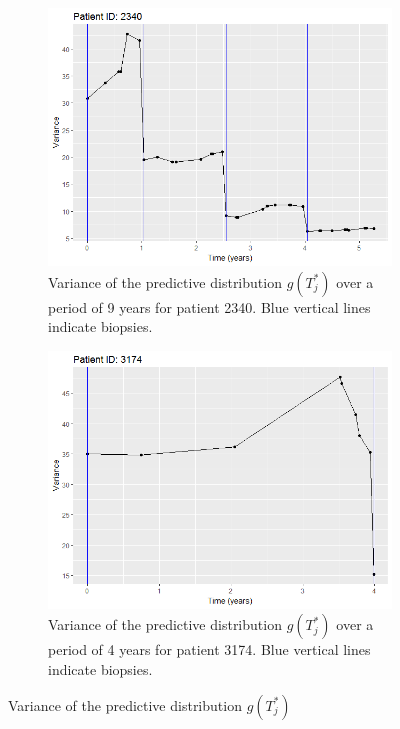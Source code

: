 \begin{figure}[!htb]
    \centering
    \captionsetup{justification=centering}
    \begin{subfigure}[b]{0.45\textwidth}
        \includegraphics[width=\textwidth]{images/variance/variance_pred_dist_2340.png}
        \caption{Variance of the predictive distribution $g(T^*_j)$ over a period of 9 years for patient 2340. Blue vertical lines indicate biopsies.}
        \label{fig : variance_pred_dist_2340}
    \end{subfigure}   
    \begin{subfigure}[b]{0.45\textwidth}
        \includegraphics[width=\textwidth]{images/variance/variance_pred_dist_3174.png}
        \caption{Variance of the predictive distribution $g(T^*_j)$ over a period of 4 years for patient 3174. Blue vertical lines indicate biopsies.}
        \label{fig : variance_pred_dist_3174}
    \end{subfigure}
    \caption{Variance of the predictive distribution $g(T^*_j)$}\label{fig : variance_pred_dist}
\end{figure}

